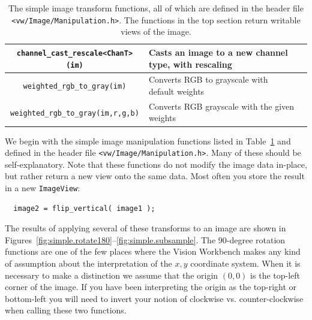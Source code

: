 \begin{table}[t]
\begin{centering}
\begin{tabular}{|c|l|l|}
\verb#channel_cast_rescale<ChanT>(im)# & Casts an image to a new channel type, with rescaling \\ \hline
\verb#weighted_rgb_to_gray(im)# & Converts RGB to grayscale with default weights \\ \hline
\verb#weighted_rgb_to_gray(im,r,g,b)# & Converts RGB grayscale with the given weights \\ \hline
\end{tabular}
\caption{The simple image transform functions, all of which are defined in the header file 
{\tt <vw/Image/Manipulation.h>}.  The functions in the top section return writable views of the image.}
\label{tbl:image-manipulation}
\end{centering}\end{table}

We begin with the simple image manipulation functions listed in
Table~\ref{tbl:image-manipulation} and defined in the header file 
\verb#<vw/Image/Manipulation.h>#.  Many of these should be 
self-explanatory.  Note that these functions do not modify 
the image data in-place, but rather return a new view onto the same 
data.  Most often you store the result in a new \verb#ImageView#:
\begin{verbatim}
  image2 = flip_vertical( image1 );
\end{verbatim}
The results of applying several of these transforms to an image 
are shown in Figures~\ref{fig:simple.rotate180}--\ref{fig:simple.subsample}.
The 90-degree rotation functions are one of the few places where the
Vision Workbench makes any kind of assumption about the interpretation
of the $x,y$ coordinate system.  When it is necessary to make a
distinction we assume that the origin $(0,0)$ is the top-left corner
of the image.  If you have been interpreting the origin as the
top-right or bottom-left you will need to invert your notion of
clockwise vs. counter-clockwise when calling these two functions.


